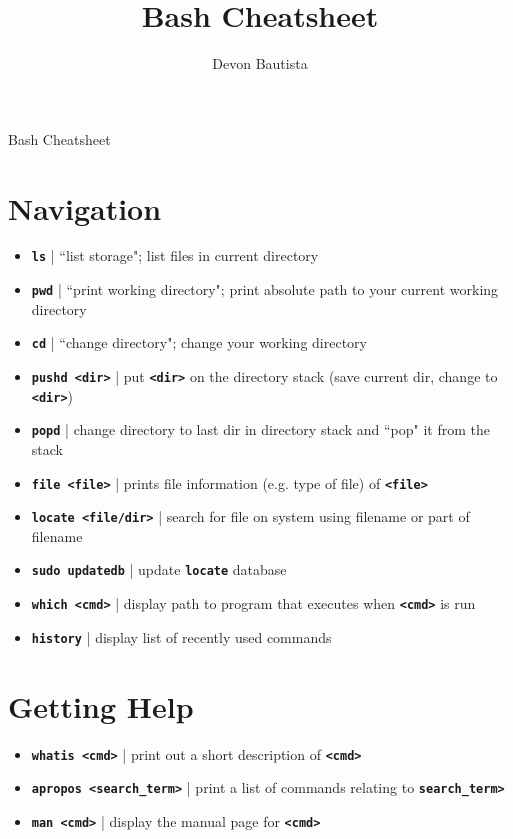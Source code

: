 \documentclass{article}
\title{Bash Cheatsheet}
\author{Devon Bautista}
\newcommand{\cmd}[1]{\texttt{\textbf{#1}}}
\begin{document}
\begin{center}
    \Huge{Bash Cheatsheet}
\end{center}
\begin{multicols}{2}
[
]
\section{Navigation}
\begin{itemize}
	\item \cmd{ls} | ``list storage"; list files in current directory
	\item \cmd{pwd} | ``print working directory"; print absolute path to your current working directory
	\item \cmd{cd} | ``change directory"; change your working directory
	\item \cmd{pushd <dir>} | put \cmd{<dir>} on the directory stack (save current dir, change to \cmd{<dir>})
	\item \cmd{popd} | change directory to last dir in directory stack and ``pop" it from the stack
	\item \cmd{file <file>} | prints file information (e.g. type of file) of \cmd{<file>}
	\item \cmd{locate <file/dir>} | search for file on system using filename or part of filename
	\item \cmd{sudo updatedb} | update \cmd{locate} database
	\item \cmd{which <cmd>} | display path to program that executes when \cmd{<cmd>} is run
	\item \cmd{history} | display list of recently used commands
\end{itemize}

\section{Getting Help}
\begin{itemize}
	\item \cmd{whatis <cmd>} | print out a short description of \cmd{<cmd>}
	\item \cmd{apropos <search\_term>} | print a list of commands relating to \cmd{search\_term>}
	\item \cmd{man <cmd>} | display the manual page for \cmd{<cmd>}
\end{itemize}


\end{multicols}
\end{document}

